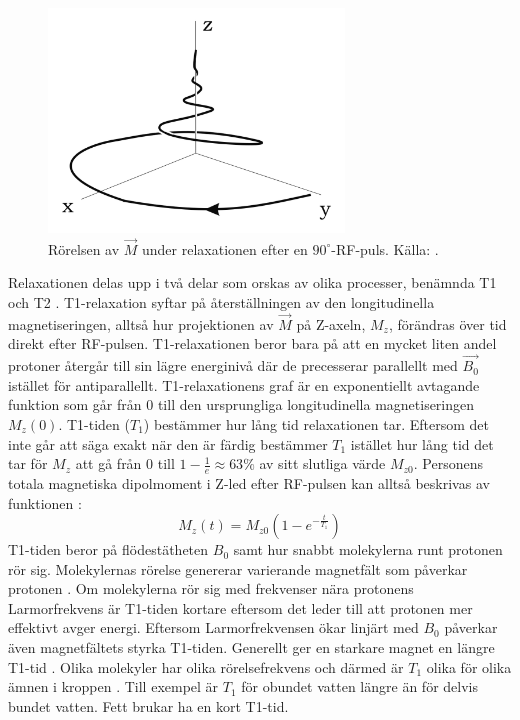 \documentclass[11pt, a4paper]{article}
\begin{document}
\begin{figure}[ht]
	\centering
	\includegraphics[width=0.7\textwidth]{relaxation}
	\caption{Rörelsen av $\vec{M}$ under relaxationen efter en $90^\circ$-RF-puls. Källa: \cite{mri_lärobok}.}
	\label{fig:relaxation}
\end{figure}

Relaxationen delas upp i två delar som orskas av olika processer, benämnda T1 och T2 \parencite{understanding_mri}. T1-relaxation syftar på återställningen av den longitudinella magnetiseringen, alltså hur projektionen av $\vec{M}$ på Z-axeln, $M_z$, förändras över tid direkt efter RF-pulsen. T1-relaxationen beror bara på att en mycket liten andel protoner återgår till sin lägre energinivå där de precesserar parallellt med $\vec{B_0}$ istället för antiparallellt. T1-relaxationens graf är en exponentiellt avtagande funktion som går från $0$ till den ursprungliga longitudinella magnetiseringen $M_{z}(0)$. T1-tiden ($T_1$) bestämmer hur lång tid relaxationen tar. Eftersom det inte går att säga exakt när den är färdig bestämmer $T_1$ istället hur lång tid det tar för $M_z$ att gå från 0 till $1-\frac{1}{e}\approx63\%$ av sitt slutliga värde $M_{z0}$. Personens totala magnetiska dipolmoment i Z-led efter RF-pulsen kan alltså beskrivas av funktionen \parencite{t1_relaxation}: 
\begin{equation}
	M_z(t)=M_{z0}(1-e^{-\frac{t}{T_1}})	
\end{equation}
T1-tiden beror på flödestätheten $B_0$ samt hur snabbt molekylerna runt protonen rör sig. Molekylernas rörelse genererar varierande magnetfält som påverkar protonen \parencite{understanding_mri}. Om molekylerna rör sig med frekvenser nära protonens Larmorfrekvens är T1-tiden kortare eftersom det leder till att protonen mer effektivt avger energi. Eftersom Larmorfrekvensen ökar linjärt med $B_0$ påverkar även magnetfältets styrka T1-tiden. Generellt ger en starkare magnet en längre T1-tid \parencite{t1_relaxation}. Olika molekyler har olika rörelsefrekvens och därmed är $T_1$ olika för olika ämnen i kroppen \parencite{understanding_mri}. Till exempel är $T_1$ för obundet vatten längre än för delvis bundet vatten. Fett brukar ha en kort T1-tid.
\end{document}

